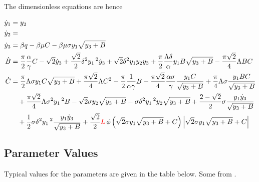 \newpage
The dimensionless equations are hence

\begin{equation}
\begin{split}
    \dot{y}_1 &= y_2 \\
    \dot{y}_2 &= \\
    \dot{y}_3 &= \beta q - \beta \mu C - \beta \mu \sigma y_1 \sqrt{y_3 + B} \\
    \dot{B} &= \frac{\pi}{2} \frac{\alpha}{\gamma} C - \sqrt{2} \dot{y}_3 + \frac{\sqrt{2}}{2} \delta^2 y_1\,^2 \dot{y}_3 + \sqrt{2} \delta^2 y_1 y_2 y_3 + \frac{\pi}{2} \frac{\Lambda \delta}{\alpha} y_1 B \sqrt{y_3 + B} - \frac{\pi \sqrt{2}}{4} \Lambda B C \\
    \dot{C} &= \frac{\pi}{2} \Lambda \sigma y_1 C \sqrt{y_3 + B}
    + \frac{\pi \sqrt{2}}{4} \Lambda C^2
    - \frac{\pi}{2} \frac{1}{\alpha \gamma} B
    - \frac{\pi \sqrt{2}}{4} \frac{\alpha \sigma}{\gamma} \frac{y_1 C}{\sqrt{y_3 + B}}
    + \frac{\pi}{4} \Lambda \sigma \frac{y_1 B C}{\sqrt{y_3 + B}}
    \\ & \quad %
    + \frac{\pi \sqrt{2}}{4} \Lambda \sigma^2 y_1\,^2 B
    - \sqrt{2} \sigma y_2 \sqrt{y_3 + B}
    - \sigma \delta^2 y_1\,^2 y_2 \sqrt{y_3 + B}
    + \frac{2-\sqrt{2}}{2} \sigma \frac{y_1 \dot{y}_3}{\sqrt{y_3 + B}} 
    \\ & \quad %
    + \frac{1}{2} \sigma \delta^2 y_1\,^2 \frac{y_1 \dot{y}_3}{\sqrt{y_3 + B}}
    + \frac{\sqrt{2}}{2} \textcolor{Red}{L} \, \phi \left( \sqrt{2} \sigma y_1 \sqrt{y_3 + B} + C \right) \left| \sqrt{2} \sigma y_1 \sqrt{y_3 + B} + C \right|
\end{split}
\end{equation}


\subsection{Parameter Values}

Typical values for the parameters are given in the table below. Some from \cite{Hos2016DynamicService}.

